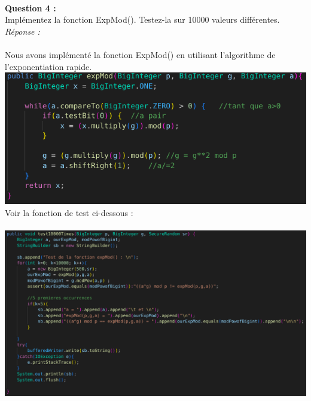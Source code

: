 \documentclass[a4paper,11pt]{article}
\begin{document}
        
        \textbf{\\Question 4 : \\}Implémentez la fonction ExpMod(). Testez-la sur 10000 valeurs différentes.
        \textit{\\Réponse :} \\\\Nous avons implémenté la fonction ExpMod() en utilisant l'algorithme de l'exponentiation rapide. \\\includegraphics[scale=0.4]{assets/ExpMod.png}\\Voir la fonction de test ci-dessous : \\\\\includegraphics[scale=0.3]{assets/testExpMod.png}
        
\end{document}
